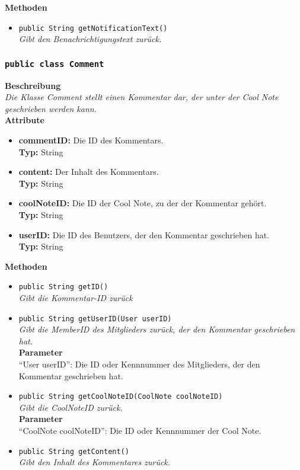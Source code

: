 	\textbf{Methoden}
	\begin{itemize}
		\item\texttt{{public String getNotificationText()}}\\
		\textit{Gibt den Benachrichtigungstext zurück.}\\
	\end{itemize}

\subsubsection{\texttt{public class Comment}}

	\textbf{Beschreibung} \\
	\textit{Die Klasse Comment stellt einen Kommentar dar, der unter der Cool Note geschrieben werden kann.} \\
	
	\textbf{Attribute}
	\begin{itemize}
		\item \textbf{commentID:} Die ID des Kommentars. \\
		\textbf{Typ:} String
		\item \textbf{content:} Der Inhalt des Kommentars. \\
		\textbf{Typ:} String
		\item \textbf{coolNoteID:} Die ID der Cool Note, zu der der Kommentar gehört. \\
		\textbf{Typ:} String
		\item \textbf{userID:} Die ID des Benutzers, der den Kommentar geschrieben hat.\\
		\textbf{Typ:} String
	\end{itemize}
	
	\textbf{Methoden}
	\begin{itemize}
		\item\texttt{public String getID()}\\
		\textit{Gibt die Kommentar-ID zurück}
		
		\item\texttt{{public String getUserID(User userID)}}\\
		\textit{Gibt die MemberID des Mitglieders zurück, der den Kommentar geschrieben hat.}\\
		\textbf{Parameter}\\
		“User userID”: Die ID oder Kennnummer des Mitglieders, der den Kommentar geschrieben hat.\\
		
		\item\texttt{{public String getCoolNoteID(CoolNote coolNoteID)}}\\
		\textit{Gibt die CoolNoteID zurück.}\\
		\textbf{Parameter}\\
		“CoolNote coolNoteID”: Die ID oder Kennnummer der Cool Note.\\
		
		\item\texttt{{public String getContent()}}\\
		\textit{Gibt den Inhalt des Kommentares zurück.}\\
	\end{itemize}

